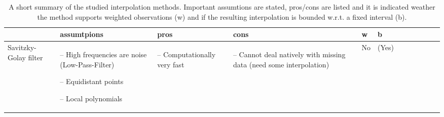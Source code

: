 \begin{table}[!ht]
	\centering
	\caption[skip=10pt]{A short summary of the studied interpolation methods. Important assumtions are stated, pros/cons are listed and it is indicated weather the method supports weighted observations (w) and if the resulting interpolation is bounded w.r.t. a fixed interval (b).}
	\small
	\begin{tabular}{p{1.6cm}p{3.3cm}p{3.3cm}p{3.4cm}p{0.4cm}p{0.4cm}p{3cm}p{3cm}p{3cm}p{3cm}p{2.7cm}p{3cm}|}
		\toprule
		~                                                                                                                                                            &
		\textbf{assumtpions}                                                                                                                                         &
		\textbf{pros}                                                                                                                                                &
		\textbf{cons}                                                                                                                                                &
		\textbf{w}                                                                                                                                      &
		\textbf{b}                                                                                                                                        \\ \hline

		Savitzky-Golay filter                                                                                                                                        &
		\begin{cptitemize}
			\item[--]  High frequencies are noise (Low-Pass-Filter) \item[--]  Equidistant points \item[--]  Local polynomials
		\end{cptitemize}                                              &
		\begin{cptitemize} \item[--]  Computationally very fast                                                                   \end{cptitemize}                   &
		\begin{cptitemize} \item[--]  Cannot deal natively with missing data (need some interpolation)                              \end{cptitemize}                 &
		No                                                                                                                                                           &
		(Yes)                                                                                                                                                         \\ \hline%


\end{tabular}
\end{table}

